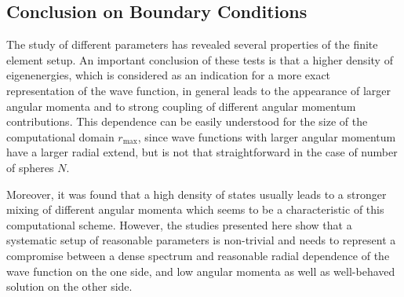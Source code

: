 \subsection{Conclusion on Boundary Conditions}
The study of different parameters has revealed several properties of the finite element setup.
An important conclusion of these tests is that a higher density of eigenenergies, which is considered as an indication for a more exact representation of the wave function, in general leads to the appearance of larger angular momenta and to strong coupling of different angular momentum contributions.
This dependence can be easily understood for the size of the computational domain $r_\text{max}$, since wave functions with larger angular momentum have a larger radial extend, but is not that straightforward in the case of number of spheres $N$.

Moreover, it was found that a high density of states usually leads to a stronger mixing of different angular momenta which seems to be a characteristic of this computational scheme.
However, the studies presented here show that a systematic setup of reasonable parameters is non-trivial and needs to  represent a compromise between a dense spectrum and reasonable radial dependence of the wave function on the one side, and low angular momenta as well as well-behaved solution on the other side.

